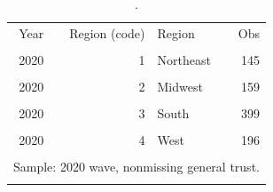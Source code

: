 \begin{table}[htbp]\centering
\caption{.}
\label{tab:trust_region_groups_2020}
\begin{tabular}{rrlr}\toprule
Year & Region (code) & Region & Obs \\\\ \midrule
2020 & 1 & Northeast & 145 \\\\
2020 & 2 & Midwest & 159 \\\\
2020 & 3 & South & 399 \\\\
2020 & 4 & West & 196 \\\\
\bottomrule
\multicolumn{4}{l}{\footnotesize Sample: 2020 wave, nonmissing general trust.} \\\\
\end{tabular}\end{table}
